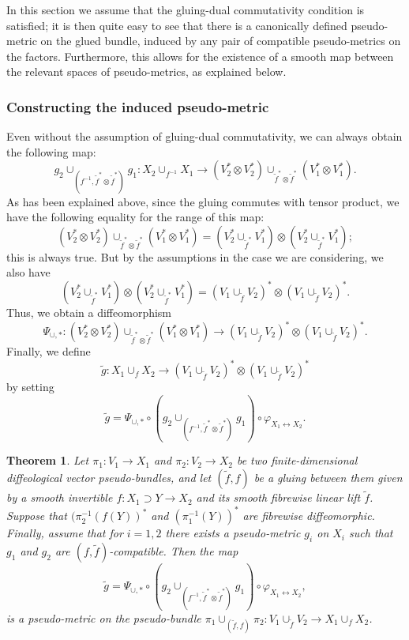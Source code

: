 \documentclass{article}
\newtheorem{thm}[lemma]{Theorem}
\begin{document}
In this section we assume that the gluing-dual commutativity condition is satisfied; it is then quite easy to see that there is a canonically defined pseudo-metric on the glued bundle, induced by any pair of 
compatible pseudo-metrics on the factors. Furthermore, this allows for the existence of a smooth map between the relevant spaces of pseudo-metrics, as explained below.


\subsubsection{Constructing the induced pseudo-metric}

Even without the assumption of gluing-dual commutativity, we can always obtain the following map:
$$g_2\cup_{(f^{-1},\tilde{f}^*\otimes\tilde{f}^*)}g_1:X_2\cup_{f^{-1}}X_1\to(V_2^*\otimes V_2^*)\cup_{\tilde{f}^*\otimes\tilde{f}^*}(V_1^*\otimes V_1^*).$$ As has been explained above, since the gluing 
commutes with tensor product, we have the following equality for the range of this map:
$$(V_2^*\otimes V_2^*)\cup_{\tilde{f}^*\otimes\tilde{f}^*}(V_1^*\otimes V_1^*)=(V_2^*\cup_{\tilde{f}^*}V_1^*)\otimes(V_2^*\cup_{\tilde{f}^*}V_1^*);$$ this is always true. But by the assumptions in the case we 
are considering, we also have
$$(V_2^*\cup_{\tilde{f}^*}V_1^*)\otimes(V_2^*\cup_{\tilde{f}^*}V_1^*)=(V_1\cup_{\tilde{f}}V_2)^*\otimes(V_1\cup_{\tilde{f}}V_2)^*.$$ Thus, we obtain a diffeomorphism
$$\Psi_{\cup,*}:(V_2^*\otimes V_2^*)\cup_{\tilde{f}^*\otimes\tilde{f}^*}(V_1^*\otimes V_1^*)\to(V_1\cup_{\tilde{f}}V_2)^*\otimes(V_1\cup_{\tilde{f}}V_2)^*.$$
Finally, we define
$$\tilde{g}:X_1\cup_f X_2\to(V_1\cup_{\tilde{f}}V_2)^*\otimes(V_1\cup_{\tilde{f}}V_2)^*$$ by setting
$$\tilde{g}=\Psi_{\cup,*}\circ(g_2\cup_{(f^{-1},\tilde{f}^*\otimes\tilde{f}^*)}g_1)\circ\varphi_{X_1\leftrightarrow X_2}.$$

\begin{thm}\label{glued:pseudo:metric:commutative:thm}
Let $\pi_1:V_1\to X_1$ and $\pi_2:V_2\to X_2$ be two finite-dimensional diffeological vector pseudo-bundles, and let $(\tilde{f},f)$ be a gluing between them given by a smooth invertible 
$f:X_1\supset Y\to X_2$ and its smooth fibrewise linear lift $\tilde{f}$. Suppose that $(\pi_2^{-1}(f(Y))^*$ and $(\pi_1^{-1}(Y))^*$ are fibrewise diffeomorphic. Finally, assume that for $i=1,2$ there exists a 
pseudo-metric $g_i$ on $X_i$ such that $g_1$ and $g_2$ are $(f,\tilde{f})$-compatible. Then the map
$$\tilde{g}=\Psi_{\cup,*}\circ(g_2\cup_{(f^{-1},\tilde{f}^*\otimes\tilde{f}^*)}g_1)\circ\varphi_{X_1\leftrightarrow X_2},$$
is a pseudo-metric on the pseudo-bundle $\pi_1\cup_{(\tilde{f},f)}\pi_2:V_1\cup_{\tilde{f}}V_2\to X_1\cup_f X_2$.
\end{thm}
\end{document}
